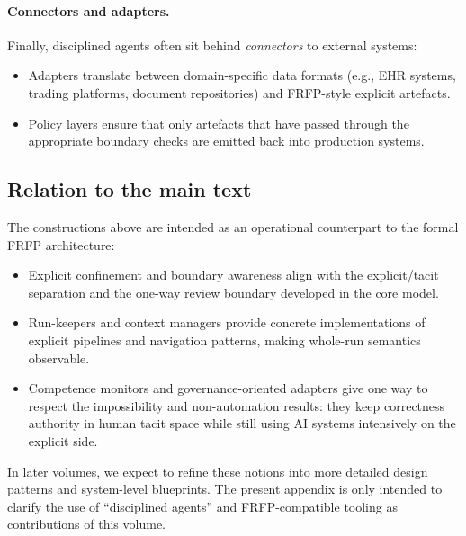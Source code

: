\paragraph{Connectors and adapters.}
Finally, disciplined agents often sit behind \emph{connectors} to external systems:
\begin{itemize}
  \item Adapters translate between domain-specific data formats (e.g., EHR systems, trading platforms, document repositories) and FRFP-style explicit artefacts.
  \item Policy layers ensure that only artefacts that have passed through the appropriate boundary checks are emitted back into production systems.
\end{itemize}

\subsection{Relation to the main text}

The constructions above are intended as an operational counterpart to the formal FRFP architecture:
\begin{itemize}
  \item Explicit confinement and boundary awareness align with the explicit/tacit separation and the one-way review boundary developed in the core model.
  \item Run-keepers and context managers provide concrete implementations of explicit pipelines and navigation patterns, making whole-run semantics observable.
  \item Competence monitors and governance-oriented adapters give one way to respect the impossibility and non-automation results: they keep correctness authority in human tacit space while still using AI systems intensively on the explicit side.
\end{itemize}

In later volumes, we expect to refine these notions into more detailed design patterns and system-level blueprints. The present appendix is only intended to clarify the use of ``disciplined agents'' and FRFP-compatible tooling as contributions of this volume.

